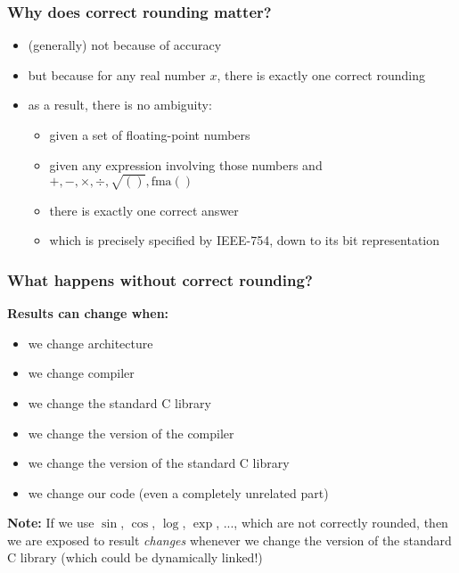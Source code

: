 \documentclass[12pt]{article}
\begin{document}
\subsubsection{Why does correct rounding matter?}

\begin{itemize}
  \item (generally) not because of accuracy
  \item but because for any real number $x$, there is exactly one correct rounding
  \item as a result, there is no ambiguity:
  \begin{itemize}
    \item given a set of floating-point numbers
    \item given any expression involving those numbers and $+, -, \times, \div, \sqrt{()}, \text{fma}()$
    \item there is exactly one correct answer
    \item which is precisely specified by IEEE-754, down to its bit representation
  \end{itemize}
\end{itemize}




\subsubsection{What happens without correct rounding?} %
\textbf{Results can change when:} %

\begin{itemize} %
  \item we change architecture
  \item we change compiler
  \item we change the standard C library
  \item we change the version of the compiler
  \item we change the version of the standard C library
  \item we change our code (even a completely unrelated part)
\end{itemize}

\textbf{Note:} If we use $\sin$, $\cos$, $\log$, $\exp$, ..., which are not correctly rounded, 
then we are exposed to result \textit{changes} 
whenever we change the version of the standard C library 
(which could be dynamically linked!)
\end{document}
